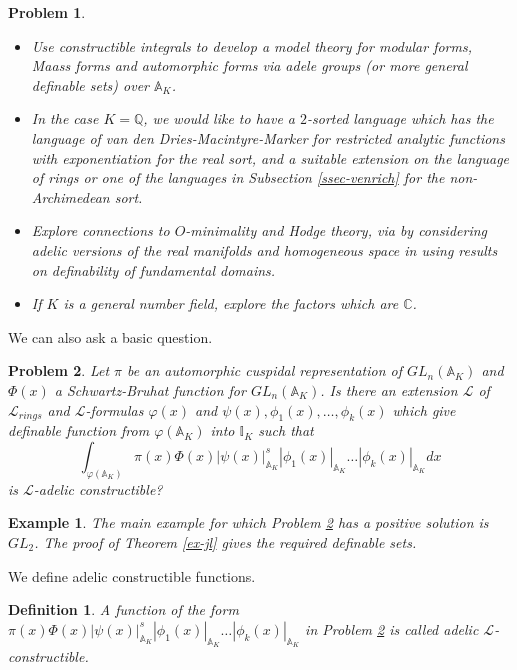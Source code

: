 \documentclass[12pt]{amsart}
\def\A{\mathbb{A}}
\def\I{\mathbb{I}}
\def\C{\mathbb{C}}
\def\cL{\mathcal{L}}
\def\C{\mathbb{C}}
\def\Q{\mathbb{Q}}
\def\cL{\mathcal{L}}
\newtheorem{Def}{Definition}[section]
\newtheorem{ex}{Example}[section]
\numberwithin{equation}{section}
\newtheorem{prob}{Problem}[section]
\begin{document}
\begin{prob}\label{forms}\noindent\begin{itemize}
\item Use constructible integrals to develop a model theory for modular forms, Maass forms and automorphic forms via adele groups (or more general definable sets) over $\A_K$. 
\item In the case $K=\Q$, we would like to have a $2$-sorted language which has the language of 
van den Dries-Macintyre-Marker \cite{VMM} for restricted analytic functions with exponentiation for the real sort, and a suitable extension on the language of rings or one of the languages in Subsection \ref{ssec-venrich} for the non-Archimedean sort. 
\item Explore connections to $O$-minimality and Hodge theory, via \cite{BKT} by considering adelic versions of the real manifolds and homogeneous space in \cite{BKT} using results on definability of fundamental domains. 
\item If $K$ is a general number field, explore the factors which are $\C$. 
\end{itemize}
\end{prob}


We can also ask a basic question.
\begin{prob}\label{basic} Let $\pi$ be an automorphic cuspidal representation of $GL_n(\A_K)$ and $\Phi(x)$ a Schwartz-Bruhat function for $GL_n(\A_K)$. 
Is there an extension $\cL$ of $\cL_{rings}$ and $\cL$-formulas $\varphi(x)$ and $\psi(x),\phi_1(x),\dots,\phi_k(x)$ which give definable function from $\varphi(\A_K)$ into $\I_K$ 
such that 
$$\int_{\varphi(\A_K)} \pi(x) \Phi(x) |\psi(x)|_{\A_K}^s|\phi_1(x)|_{\A_K}\dots |\phi_k(x)|_{\A_K} dx$$
is $\cL$-adelic constructible?
\end{prob}
\begin{ex} The main example for which Problem \ref{basic} has a positive solution is $GL_2$. The proof of Theorem \ref{ex-jl} gives the required definable sets.
\end{ex}
We define adelic constructible functions.
\begin{Def}\label{con-fn} A function of the form $\pi(x) \Phi(x) |\psi(x)|_{\A_K}^s|\phi_1(x)|_{\A_K}\dots |\phi_k(x)|_{\A_K}$ in Problem \ref{basic} is called adelic $\cL$-constructible.\end{Def}
\end{document}
